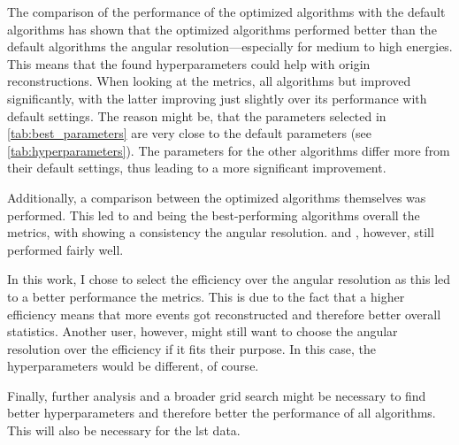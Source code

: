 The comparison of the performance of the optimized algorithms with the default algorithms has shown that
the optimized algorithms performed better than the default algorithms \wrt the angular resolution---especially
for medium to high energies. This means that the found hyperparameters could help with origin reconstructions. When looking at the metrics,
all algorithms but \fact{} improved significantly, with the latter improving just slightly over its performance with default settings.
The reason might be, that the parameters selected in \autoref{tab:best_parameters} are very close to the default parameters
(see \autoref{tab:hyperparameters}). The parameters for the other algorithms differ more from their default settings,
thus leading to a more significant improvement.

Additionally, a comparison between the optimized algorithms themselves was performed. This led to \fact{} and \mars{}
being the best-performing algorithms overall \wrt the metrics, with \mars{} showing a consistency \wrt the
angular resolution. \tailcuts{} and \tcc{}, however, still performed fairly well.

In this work, I chose to select the efficiency over the angular resolution as this led to a better
performance \wrt the metrics. This is due to the fact that a higher efficiency means
that more events got reconstructed and therefore better overall statistics. Another user, however,
might still want to choose the angular resolution over the efficiency if it fits their purpose.
In this case, the hyperparameters would be different, of course.

Finally, further analysis and a broader grid search might be necessary to find better hyperparameters
and therefore better the performance of all algorithms. This will also be necessary for the \gls{lst} data.

